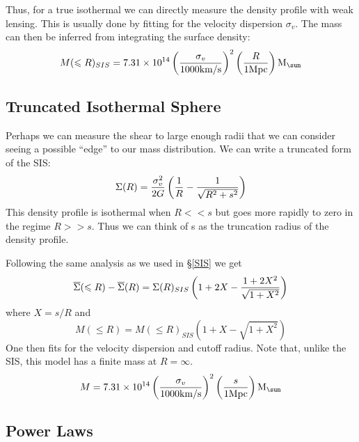 \documentclass[preprint]{aastex}
\begin{document}
Thus, for a true isothermal we can directly measure the density profile with weak
lensing.  This is usually done by fitting for the velocity dispersion
$\sigma_v$.  The mass can then be inferred from integrating the surface 
density:
\begin{equation}
M(\leqslant R)_{SIS} = 7.31 \times 10^{14}\left( \sigma_v \over 1000 \textrm{km/s} \right)^2 
\left(R \over 1\textrm{Mpc} \right) \textrm{M$_{\sun}$}
\end{equation}
 
\subsection{Truncated Isothermal Sphere} \label{SIStrunc}
Perhaps we can measure the shear to large enough radii that we can consider
seeing a possible ``edge'' to our mass distribution. We can write a truncated form of the SIS:
\begin{equation}
\Sigma(R) = { \sigma_v^2 \over {2 G} } 
\left( {1 \over R} - {1 \over \sqrt{ R^2 + s^2 }} \right)
\end{equation}
This density profile is isothermal when $R << s$ but goes more rapidly to zero in
the regime $R >> s$.  Thus we can think of s as the truncation radius of the
density profile.

Following the same analysis as we used in \S \ref{SIS} we get
\begin{equation}
\overline{\Sigma}(\leqslant R) - \overline{\Sigma}(R) = \Sigma(R)_{SIS}
 \left( 1 + 2 X - { {1 + 2 X^2}  \over \sqrt{1+ X^2}  } \right)
\end{equation}
where $X = s/R$ and
\begin{equation}
M(\leqslant R) = M(\leqslant R)_{SIS} \left(1 + X - \sqrt{1 + X^2}\right)
\end{equation}
One then fits for the velocity dispersion and cutoff radius.  Note that, unlike
the SIS, this model has a finite mass at $R = \infty$.
\begin{equation}
M = 7.31\times10^{14}\left( \sigma_v \over 1000 \textrm{km/s} \right)^2 
\left(s \over 1\textrm{Mpc} \right) \textrm{M$_{\sun}$}
\end{equation}

\subsection{Power Laws}
\end{document}
